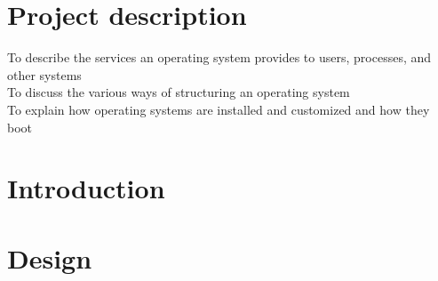 \documentclass[a4paper,10pt,titlepage]{report}
\date{}
\begin{document}
\renewcommand{\thepage}{\roman{page}}%
\tableofcontents
\newpage
\setcounter{page}{1}
\renewcommand{\thepage}{\arabic{page}}
\section{Project description}
To describe the services an operating system provides to
users, processes, and other systems\\
To discuss the various ways of structuring an operating
system\\
To explain how operating systems are installed and
customized and how they boot\\
\newpage

\section{Introduction}



\section{Design}
\end{document}
